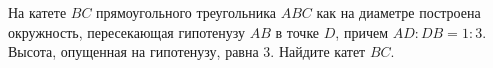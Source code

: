 \begin{ex}
	\begin{condition}
		На катете \( BC  \) прямоугольного треугольника \( ABC \) как на диаметре построена окружность, пересекающая гипотенузу \( AB  \) в точке \( D \), причем \( AD : DB = 1 : 3 \). Высота, опущенная на гипотенузу, равна \( 3 \). Найдите катет \( BC \).
	\end{condition}
\end{ex}